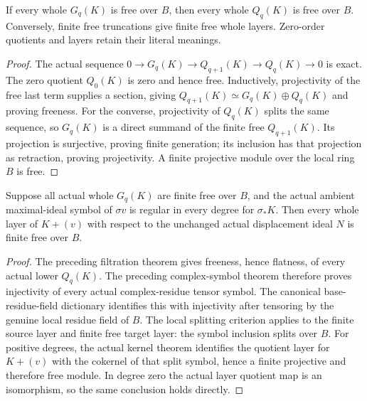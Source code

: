 \begin{theorem}
\label{hir:actual-joint-cut-layer-truncation-free}
\leanok
{}
If every whole $G_q(K)$ is free over $B$, then every whole $Q_q(K)$
is free over $B$. Conversely, finite free truncations give finite free
whole layers. Zero-order quotients and layers retain their literal meanings.
\end{theorem}
\begin{proof}
The actual sequence $0\to G_q(K)\to Q_{q+1}(K)\to Q_q(K)\to0$
is exact. The zero quotient $Q_0(K)$ is zero and hence free. Inductively,
projectivity of the free last term supplies a section, giving
$Q_{q+1}(K)\simeq G_q(K)\oplus Q_q(K)$ and proving freeness.
For the converse, projectivity of $Q_q(K)$ splits the same sequence,
so $G_q(K)$ is a direct summand of the finite free $Q_{q+1}(K)$.
Its projection is surjective, proving finite generation; its inclusion
has that projection as retraction, proving projectivity. A finite
projective module over the local ring $B$ is free.
\end{proof}

\begin{theorem}
\label{hir:actual-joint-cut-layer-free}
\leanok
{}
Suppose all actual whole $G_q(K)$ are finite free over $B$, and the
actual ambient maximal-ideal symbol of $\sigma v$ is regular in every
degree for $\sigma_*K$. Then every whole layer of
$K+(v)$ with respect to the unchanged actual displacement ideal $N$
is finite free over $B$.
\end{theorem}
\begin{proof}
The preceding filtration theorem gives freeness, hence flatness, of
every actual lower $Q_q(K)$. The preceding complex-symbol theorem
therefore proves injectivity of every actual complex-residue tensor
symbol. The canonical base-residue-field dictionary identifies this
with injectivity after tensoring by the genuine local residue field of
$B$. The local splitting criterion applies to the finite source layer
and finite free target layer: the symbol inclusion splits over $B$.
For positive degrees, the actual kernel theorem identifies the quotient
layer for $K+(v)$ with the cokernel of that split symbol, hence a finite
projective and therefore free module. In degree zero the actual layer
quotient map is an isomorphism, so the same conclusion holds directly.
\end{proof}

